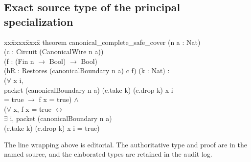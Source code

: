 \documentclass[11pt,letterpaper]{article}
\begin{document}
\subsection*{Exact source type of the principal specialization}
{\fontsize{8.7}{10.8}\selectfont\ttfamily
\begin{tabbing}
xx\=xxxx\=xxxx\=\kill
theorem canonical\_complete\_safe\_cover (n a : Nat)\\
\> (c : Circuit (CanonicalWire n a))\\
\> (f : (Fin n $\to$ Bool) $\to$ Bool)\\
\> (hR : Restores (canonicalBoundary n a) c f) (k : Nat) :\\
\> ($\forall$ x i,\\
\>\> packet (canonicalBoundary n a) (c.take k) (c.drop k) x i\\
\>\> = true $\to$ f x = true) $\land$\\
\> ($\forall$ x, f x = true $\leftrightarrow$\\
\>\> $\exists$ i, packet (canonicalBoundary n a)\\
\>\>\> (c.take k) (c.drop k) x i = true)
\end{tabbing}}
The line wrapping above is editorial. The authoritative type and proof are in the named source, and the elaborated types are retained in the audit log.
\end{document}
